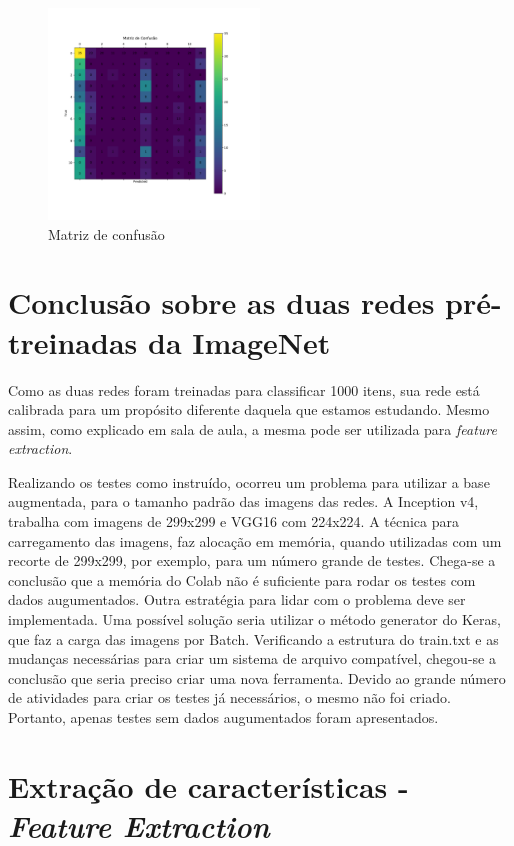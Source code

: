 \documentclass[12pt,
	english,			%
	french,				%
	spanish,			%
	brazil,				%
	]{article}
\begin{document}
\begin{figure}[!htb]
\centering
\includegraphics[width=0.5\textwidth]{images/cm_vgg16.pdf}
\caption{\label{fig:grafico01}Matriz de confusão}
\end{figure}

\clearpage


\section{Conclusão sobre as duas redes pré-treinadas da ImageNet}

Como as duas redes foram treinadas para classificar 1000 itens, sua rede está calibrada para um propósito diferente daquela que estamos estudando. Mesmo assim, como explicado em sala de aula, a mesma pode ser utilizada para \textit{feature extraction}.

Realizando os testes como instruído, ocorreu um problema para utilizar a base augmentada, para o tamanho padrão das imagens das redes. A Inception v4, trabalha com imagens de 299x299 e VGG16 com 224x224. A técnica para carregamento das imagens, faz alocação em memória, quando utilizadas com um recorte de 299x299, por exemplo, para um número grande de testes. Chega-se a conclusão que a memória do Colab não é suficiente para rodar os testes com dados augumentados. Outra estratégia para lidar com o problema deve ser implementada. Uma possível solução seria utilizar o método generator do Keras, que faz a carga das imagens por Batch. Verificando a estrutura do train.txt e as mudanças necessárias para criar um sistema de arquivo compatível, chegou-se a conclusão que seria preciso criar uma nova ferramenta. Devido ao grande número de atividades para criar os testes já necessários, o mesmo não foi criado. Portanto, apenas testes sem dados augumentados foram apresentados. 

\section{Extração de características - \textit{Feature Extraction}}
\end{document}
